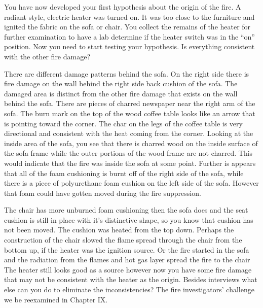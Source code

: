 \documentclass[twoside]{uocthesis}
\begin{document}
{You have now developed your first hypothesis about the origin of the fire.  A radiant style, electric heater was turned on.  It was too close to the furniture and ignited the fabric on the sofa or chair.  You collect the remains of the heater for further examination to have a lab determine if the heater switch was in the ``on'' position.  Now you need to start testing your hypothesis.  Is everything consistent with the other fire damage?  

There are different damage patterns behind the sofa.  On the right side there is fire damage on the wall behind the right side back cushion of the sofa. The damaged area is distinct from the other fire damage that exists on the wall behind the sofa. There are pieces of charred newspaper near the right arm of the sofa.  The burn mark on the top of the wood coffee table looks like an arrow that is pointing toward the corner.  The char on the legs of the coffee table is very directional and consistent with the heat coming from the corner.  Looking at the inside area of the sofa, you see that there is charred wood on the inside surface of the sofa frame while the outer portions of the wood frame are not charred.  This would indicate that the fire was inside the sofa at some point.  Further is appears that all of the foam cushioning is burnt off of the right side of the sofa, while there is a piece of polyurethane foam cushion on the left side of the sofa.  However that foam could have gotten moved during the fire suppression. 

The chair has more unburned foam cushioning then the sofa does and the seat cushion is still in place with it's distinctive shape, so you know that cushion has not been moved.  The cushion was heated from the top down.  Perhaps the construction of the chair slowed the flame spread through the chair from the bottom up, if the heater was the ignition source.  Or the fire started in the sofa and the radiation from the flames and hot gas layer spread the fire to the chair  The heater still looks good as a source however now you have some fire damage that may not be consistent with the heater as the origin.  Besides interviews what else can you do to eliminate the inconsistencies?   The fire investigators' challenge we be reexamined in Chapter IX.     

}
\end{document}
